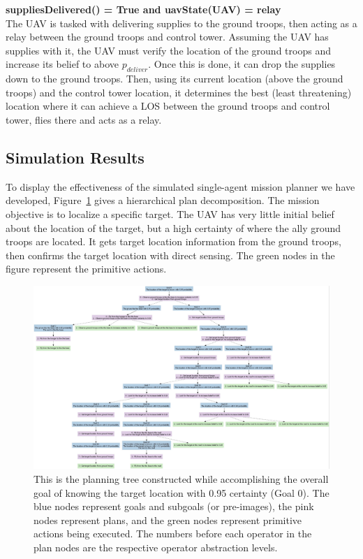\documentclass[12pt]{article}
\begin{document}
\noindent
\textbf{suppliesDelivered() = True and uavState(UAV) = relay} \\
The UAV is tasked with delivering supplies to the ground troops, then acting as a relay between the ground troops and control tower. Assuming the UAV has supplies with it, the UAV must verify the location of the ground troops and increase its belief to above $p_{deliver}$. Once this is done, it can drop the supplies down to the ground troops. Then, using its current location (above the ground troops) and the control tower location, it determines the best (least threatening) location where it can achieve a LOS between the ground troops and control tower, flies there and acts as a relay. \\

\subsection{Simulation Results}

To display the effectiveness of the simulated single-agent mission planner we have developed, Figure~\ref{tree-1} gives a hierarchical plan decomposition. The mission objective is to localize a specific target. The UAV has very little initial belief about the location of the target, but a high certainty of where the ally ground troops are located. It gets target location information from the ground troops, then confirms the target location with direct sensing. The green nodes in the figure represent the primitive actions.

\begin{figure}
 \includegraphics[width=18cm]{example-tree1}
 \caption{This is the planning tree constructed while accomplishing the overall goal of knowing the target location with 0.95 certainty (Goal 0). The blue nodes represent goals and subgoals (or pre-images), the pink nodes represent plans, and the green nodes represent primitive actions being executed. The numbers before each operator in the plan nodes are the respective operator abstraction levels.}
 \label{tree-1}
\end{figure}
\end{document}

